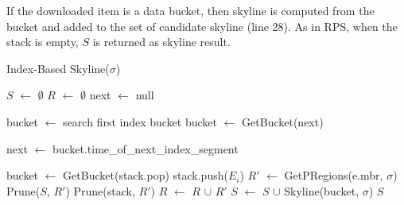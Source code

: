 If the downloaded item is a data bucket, then skyline is computed from the bucket and added to the set of candidate skyline (line 28). As in RPS, when the stack is empty, $S$ is returned as skyline result.

\begin{algorithm}[!h]
\caption{Index-Based Skyline($\sigma$)} \label{alg:IBSkyline}
\begin{algorithmic}[1]

\STATE $S$ $\gets$ $\emptyset$
\STATE $R$ $\gets$ $\emptyset$
\REPEAT
    \STATE next $\gets$ null

        \STATE bucket $\gets$ search first index bucket
    \ELSE
        \STATE bucket $\gets$ GetBucket(next)
    \ENDIF

        \STATE next $\gets$ bucket.time\_of\_next\_index\_segment
    \ENDIF

            \STATE bucket $\gets$ GetBucket(stack.pop)
        \ENDIF
                    \STATE stack.push($E_i$)
                    \STATE $R'$ $\gets$ GetPRegions(e.mbr, $\sigma$)
                    \STATE Prune($S$, $R'$)
                    \STATE Prune(stack, $R'$)
                    \STATE $R$ $\gets$ $R$ $\cup$ $R'$
                \ENDIF
            \ENDFOR
        \ELSE
            \STATE $S$ $\gets$ $S$ $\cup$ Skyline(bucket, $\sigma$)
        \ENDIF
    \ENDWHILE
{}
\RETURN $S$
\end{algorithmic}
\end{algorithm}

%


